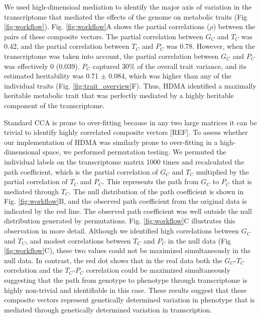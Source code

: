 \documentclass[
]{article}
\begin{document}
We used high-dimensioal mediation to identify the major axis of
variation in the transcriptome that mediated the effects of the genome
on metabolic traits (Fig \ref{fig:workflow}). Fig. \ref{fig:workflow}A
shows the partial correlations (\(\rho\)) between the pairs of these
composite vectors. The partial correlation between \(G_C\) and \(T_C\)
was 0.42, and the partial correlation between \(T_C\) and \(P_C\) was
0.78. However, when the transcriptome was taken into account, the
partial correlation between \(G_C\) and \(P_C\) was effectively 0
(0.039). \(P_C\) captured 30\% of the overall trait variance, and its
estimated heritability was 0.71 \(\pm\) 0.084, which was higher than any
of the individual traits (Fig. \ref{fig:trait_overview}F). Thus, HDMA
identified a maximally heritable metabolic trait that was perfectly
mediated by a highly heritable component of the transcriptome.

Standard CCA is prone to over-fitting because in any two large matrices
it can be trivial to identify highly correlated composite vectors
{[}REF{]}. To assess whether our implementation of HDMA was similarly
prone to over-fitting in a high-dimensional space, we performed
permutation testing. We permuted the individual labels on the
transcriptome matrix 1000 times and recalculated the path coefficient,
which is the partial correlation of \(G_C\) and \(T_C\) multiplied by
the partial correlation of \(T_C\) and \(P_C\). This represents the path
from \(G_C\) to \(P_C\) that is mediated through \(T_C\). The null
distribution of the path coefficient is shown in Fig.
\ref{fig:workflow}B, and the observed path coefficient from the original
data is indicated by the red line. The observed path coefficient was
well outside the null distribution generated by permutations. Fig.
\ref{fig:workflow}C illustrates this observation in more detail.
Although we identified high correlations between \(G_C\) and \(T_C\),
and modest correlations between \(T_C\) and \(P_C\) in the null data
(Fig \ref{fig:workflow}C), these two values could not be maximized
simultaneously in the null data. In contrast, the red dot shows that in
the real data both the \(G_C\)-\(T_C\) correlation and the
\(T_C\)-\(P_C\) correlation could be maximized simultaneously suggesting
that the path from genotype to phenotype through transcriptome is highly
non-trivial and identifiable in this case. These results suggest that
these composite vectors represent genetically determined variation in
phenotype that is mediated through genetically determined variation in
transcription.
\end{document}
